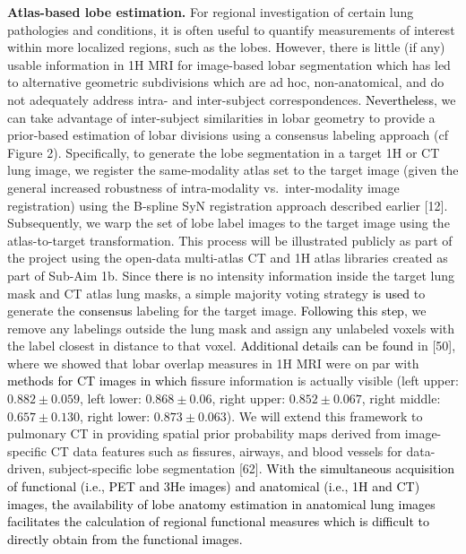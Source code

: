 \documentclass[11pt,]{article}
\begin{document}
\textbf{Atlas-based lobe estimation.} For regional investigation of
certain lung pathologies and conditions, it is often useful to quantify
measurements of interest within more localized regions, such as the
lobes. However, there is little (if any) usable information in 1H MRI
for image-based lobar segmentation which has led to alternative
geometric subdivisions which are ad hoc, non-anatomical, and do not
adequately address intra- and inter-subject correspondences.
\textcolor{black}{Nevertheless}, we can take advantage of inter-subject
similarities in lobar geometry to provide a prior-based estimation of
lobar divisions using a consensus labeling approach (cf Figure 2).
Specifically, to generate the lobe segmentation in a target 1H or CT
lung image, we register the same-modality atlas set to the target image
(given the general increased robustness of intra-modality
vs.~inter-modality image registration) using the B-spline SyN
registration approach described earlier {[}12{]}. Subsequently, we warp
the set of lobe label images to the target image using the
atlas-to-target transformation. This process will be illustrated
publicly as part of the project using the open-data multi-atlas CT and
1H atlas libraries created as part of Sub-Aim 1b. Since
\textcolor{black}{there is} no intensity information inside the target
lung mask and CT atlas lung masks, a simple majority voting strategy
\textcolor{black}{is used} to generate the \textcolor{black}{consensus}
labeling for the target image. \textcolor{black}{Following this step},
we remove any labelings outside the lung mask and assign any unlabeled
voxels with the label closest in distance to that voxel.
\textcolor{black}{Additional details can be found} in {[}50{]}, where we
showed that lobar overlap measures in 1H MRI were on par with
\textcolor{black}{methods for CT images  in which} fissure information
is actually visible (left upper: \(0.882 \pm 0.059\), left lower:
\(0.868 \pm 0.06\), right upper: \(0.852 \pm 0.067\), right middle:
\(0.657 \pm 0.130\), right lower: \(0.873 \pm 0.063\)). We will extend
this framework to pulmonary CT in providing spatial prior probability
maps derived from image-specific CT data features such as fissures,
airways, and blood vessels for data-driven, subject-specific lobe
segmentation {[}62{]}.
\textcolor{black}{With the simultaneous acquisition of functional (i.e., PET and 3He images)
and anatomical (i.e., 1H and CT) images, the availability of lobe anatomy estimation
in anatomical lung images facilitates the calculation of regional functional measures which
is difficult to directly obtain from the functional images.}
\end{document}
